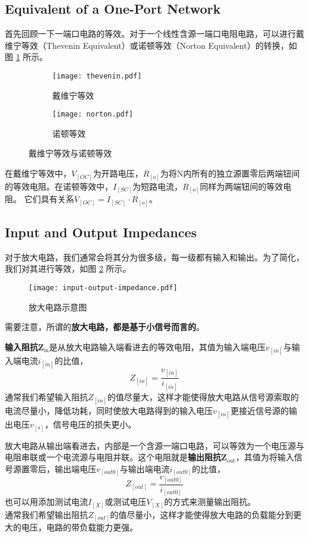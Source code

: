 \subsection{Equivalent of a One-Port Network}
首先回顾一下一端口电路的等效。对于一个线性含源一端口电阻电路，可以进行戴维宁等效（Thevenin Equivalent）或诺顿等效（Norton Equivalent）的转换，如图 \ref{fig:thevenin-norton-equivalent} 所示。
\begin{figure}[htp!]
    \centering
    \begin{subfigure}[b]{\textwidth}
        \centering
        \texttt{[image: thevenin.pdf]}
        \caption{戴维宁等效}
    \end{subfigure}
    \begin{subfigure}[b]{\linewidth}
        \centering
        \texttt{[image: norton.pdf]}
        \caption{诺顿等效}
    \end{subfigure}
    \caption{戴维宁等效与诺顿等效}
    \label{fig:thevenin-norton-equivalent}
\end{figure}

在戴维宁等效中，$V_[OC]$为开路电压，$R_[o]$为将N内所有的独立源置零后两端钮间的等效电阻。在诺顿等效中，$I_[SC]$为短路电流，$R_[o]$同样为两端钮间的等效电阻。
它们具有关系$V_[OC] = I_[SC] \cdot R_[o]$。

\subsection{Input and Output Impedances}
对于放大电路，我们通常会将其分为很多级，每一级都有输入和输出。为了简化，我们对其进行等效，如图 \ref{fig:input-output-impedance} 所示。
\begin{figure}[!htb]
    \centering
    \texttt{[image: input-output-impedance.pdf]}
    \caption{放大电路示意图}
    \label{fig:input-output-impedance}
\end{figure}
需要注意，所谓的\textbf{放大电路，都是基于小信号而言的}。

\textbf{输入阻抗}$\bm{Z_{\mathrm{in}}}$是从放大电路输入端看进去的等效电阻，其值为输入端电压$v_[in]$与输入端电流$i_[in]$的比值，
\begin{equation}
    Z_[in] = \frac{v_[in]}{i_[in]}
\end{equation}
通常我们希望输入阻抗$Z_[in]$的值尽量大，这样才能使得放大电路从信号源索取的电流尽量小，降低功耗，同时使放大电路得到的输入电压$v_[in]$更接近信号源的输出电压$v_[s]$，信号电压的损失更小。

放大电路从输出端看进去，内部是一个含源一端口电路，可以等效为一个电压源与电阻串联或一个电流源与电阻并联。这个电阻就是\textbf{输出阻抗}$\bm{Z_{\mathrm{out}}}$，其值为将输入信号源置零后，输出端电压$v_[out0]$与输出端电流$i_[out0]$的比值，
\begin{equation}
    Z_[out] = \frac{v_[out0]}{i_[out0]}
\end{equation}
也可以用添加测试电流$I_[X]$或测试电压$V_[X]$的方式来测量输出阻抗。\\
通常我们希望输出阻抗$Z_[out]$的值尽量小，这样才能使得放大电路的负载能分到更大的电压，电路的带负载能力更强。

